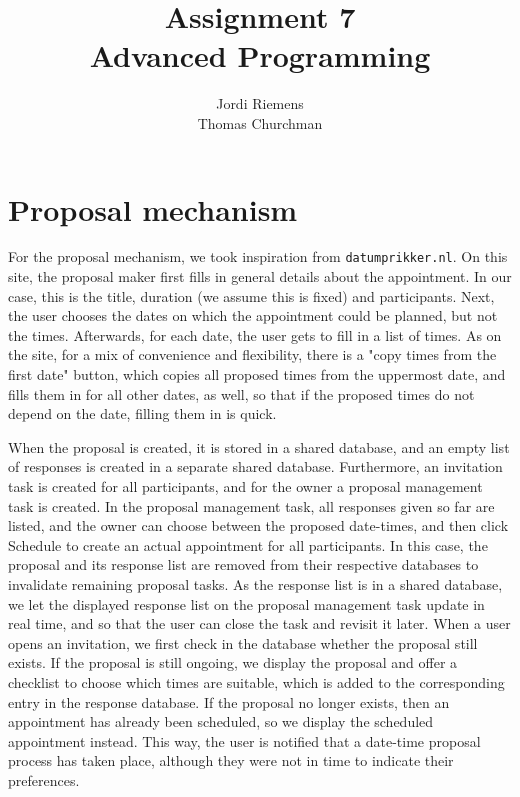 \documentclass{article}
\title{Assignment 7\\\normalsize{Advanced Programming}}
\author{Jordi Riemens\\Thomas Churchman}
\begin{document}
	\maketitle
	
	\section{Proposal mechanism}
    For the proposal mechanism, we took inspiration from \texttt{datumprikker.nl}.
    On this site, the proposal maker first fills in general details about the appointment. In our case, this is the title, duration (we assume this is fixed) and participants.
    Next, the user chooses the dates on which the appointment could be planned, but not the times. Afterwards, for each date, the user gets to fill in a list of times.
    As on the site, for a mix of convenience and flexibility, there is a "copy times from the first date" button, which copies all proposed times from the uppermost date,
    and fills them in for all other dates, as well, so that if the proposed times do not depend on the date, filling them in is quick.
    
    When the proposal is created, it is stored in a shared database, and an empty list of responses is created in a separate shared database.
    Furthermore, an invitation task is created for all participants, and for the owner a proposal management task is created.
    In the proposal management task, all responses given so far are listed, and the owner can choose between the proposed date-times, and then click Schedule to create an actual appointment for all participants.
    In this case, the proposal and its response list are removed from their respective databases to invalidate remaining proposal tasks.
    As the response list is in a shared database, we let the displayed response list on the proposal management task update in real time, and so that the user can close the task and revisit it later.
    When a user opens an invitation, we first check in the database whether the proposal still exists.
    If the proposal is still ongoing, we display the proposal and offer a checklist to choose which times are suitable, which is added to the corresponding entry in the response database.
    If the proposal no longer exists, then an appointment has already been scheduled, so we display the scheduled appointment instead.
    This way, the user is notified that a date-time proposal process has taken place, although they were not in time to indicate their preferences.
    
\end{document}
